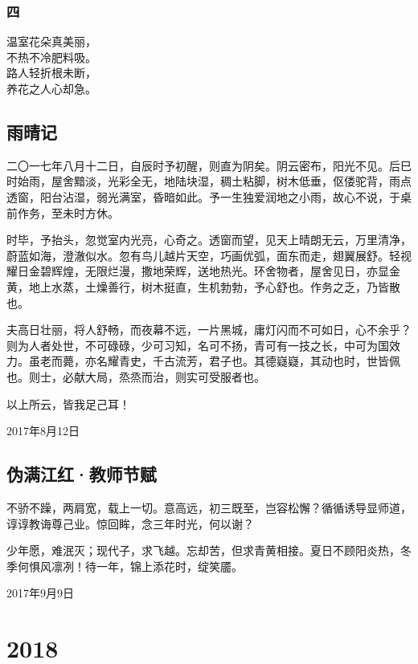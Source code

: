 \documentclass[a5paper]{ctexart}
\begin{document}
	
	\subsubsection{四}
	\begin{center}
		温室花朵真美丽，\\
		不热不冷肥料吸。\\
		路人轻折根未断，\\
		养花之人心却急。
	\end{center}

	
	
	\subsection{雨晴记}
	二〇一七年八月十二日，自辰时予初醒，则直为阴矣。阴云密布，阳光不见。后巳时始雨，屋舍黯淡，光彩全无，地陆块湿，稠土粘脚，树木低垂，伛偻驼背，雨点透窗，阳台沾湿，弱光满室，昏暗如此。予一生独爱润地之小雨，故心不说，于桌前作务，至未时方休。
	
	时毕，予抬头，忽觉室内光亮，心奇之。透窗而望，见天上晴朗无云，万里清净，蔚蓝如海，澄澈似水。忽有鸟儿越片天空，巧画优弧，面东而走，翅翼展舒。轻视耀日金碧辉煌，无限烂漫，撒地荣辉，送地热光。环舍物者，屋舍见日，亦显金黄，地上水蒸，土燥善行，树木挺直，生机勃勃，予心舒也。作务之乏，乃皆散也。
	
	夫高日壮丽，将人舒畅，而夜幕不远，一片黑城，庸灯闪而不可如日，心不余乎？则为人者处世，不可碌碌，少可习知，名可不扬，青可有一技之长，中可为国效力。虽老而薨，亦名耀青史，千古流芳，君子也。其德嶷嶷，其动也时，世皆佩也。则士，必献大局，烝烝而治，则实可受服者也。
	
	以上所云，皆我足己耳！
	\begin{flushright}
		2017年8月12日
	\end{flushright}
	
	\subsection{伪满江红·教师节赋}
	不骄不躁，两肩宽，载上一切。意高远，初三既至，岂容松懈？循循诱导显师道，谆谆教诲尊己业。惊回眸，念三年时光，何以谢？
	
	少年愿，难泯灭；现代子，求飞越。忘却苦，但求青黄相接。夏日不顾阳炎热，冬季何惧风凛冽！待一年，锦上添花时，绽笑靥。
	\begin{flushright}
		2017年9月9日
	\end{flushright}
	\newpage
	\section{2018}
\end{document}
